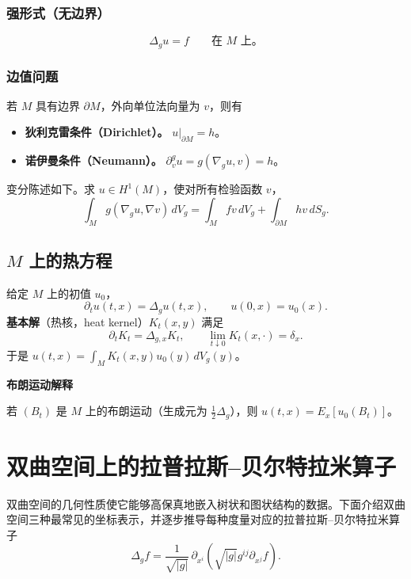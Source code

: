 \subsubsection{强形式（无边界）}
\begin{equation*}
  \Delta_g u=f\qquad\text{在 $M$ 上。}
  \tag{3.15}\label{eq:3.15}
\end{equation*}

\subsubsection{边值问题}
若 $M$ 具有边界 $\partial M$，外向单位法向量为 $v$，则有
\begin{itemize}
\item \textbf{狄利克雷条件（Dirichlet）。} $\left.u\right|_{\partial M}=h$。
\item \textbf{诺伊曼条件（Neumann）。} $\partial_v^gu=g(\nabla_gu,v)=h$。
\end{itemize}
变分陈述如下。求 $u\in H^1(M)$，使对所有检验函数 $v$，%
%
\begin{equation*}
  \int_M g(\nabla_gu,\nabla v)\,dV_g
    =\int_M fv\,dV_g+\int_{\partial M}hv\,dS_g.
  \tag{3.16}\label{eq:3.16}
\end{equation*}

\subsection{\texorpdfstring{$M$}{M} 上的热方程}
给定 $M$ 上的初值 $u_0$，
\begin{equation*}
  \partial_tu(t,x)=\Delta_gu(t,x),\qquad u(0,x)=u_0(x).
  \tag{3.17}\label{eq:3.17}
\end{equation*}
\textbf{基本解}（热核，heat kernel）$K_t(x,y)$ 满足
\[
  \partial_tK_t=\Delta_{g,x}K_t,\qquad \lim_{t\downarrow0}K_t(x,\cdot)=\delta_x.
\]
于是 $u(t,x)=\displaystyle\int_M K_t(x,y)u_0(y)\,dV_g(y)$。

\noindent\textbf{布朗运动解释}\par
若 $(B_t)$ 是 $M$ 上的布朗运动（生成元为 $\tfrac12\Delta_g$），则 $u(t,x)=E_x[u_0(B_t)]$。%

\section{双曲空间上的拉普拉斯–贝尔特拉米算子}
\label{sec:3.11}
双曲空间的几何性质使它能够高保真地嵌入树状和图状结构的数据。下面介绍双曲空间三种最常见的坐标表示，并逐步推导每种度量对应的拉普拉斯–贝尔特拉米算子
\begin{equation*}
  \Delta_g f=\frac{1}{\sqrt{|g|}}\,\partial_{x^i}
       \left(\sqrt{|g|}g^{ij}\partial_{x^j}f\right).
  \tag{3.18}\label{eq:3.18}
\end{equation*}

